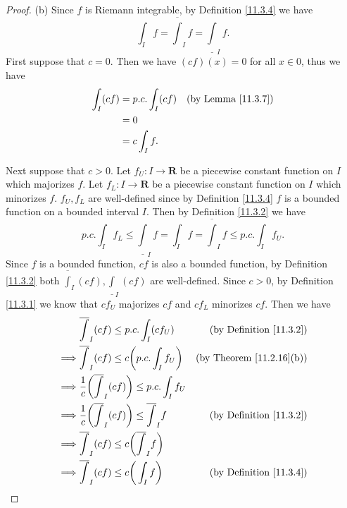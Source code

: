 \begin{proof}{(b)}
    Since \(f\) is Riemann integrable, by Definition \ref{11.3.4} we have
    \[
        \int_I f = \overline{\int}_I f = \underline{\int}_I f.
    \]
    First suppose that \(c = 0\).
    Then we have \((cf)(x) = 0\) for all \(x \in 0\), thus we have
    \begin{align*}
        \int_I (cf) & = p.c. \int_I (cf) & \text{(by Lemma \ref{11.3.7})} \\
                    & = 0                                                 \\
                    & = c \int_I f.
    \end{align*}

    Next suppose that \(c > 0\).
    Let \(f_U : I \to \mathbf{R}\) be a piecewise constant function on \(I\) which majorizes \(f\).
    Let \(f_L : I \to \mathbf{R}\) be a piecewise constant function on \(I\) which minorizes \(f\).
    \(f_U, f_L\) are well-defined since by Definition \ref{11.3.4} \(f\) is a bounded function on a bounded interval \(I\).
    Then by Definition \ref{11.3.2} we have
    \[
        p.c. \int_I f_L \leq \underline{\int}_I f = \int_I f = \overline{\int}_I f \leq p.c. \int_I f_U.
    \]
    Since \(f\) is a bounded function, \(cf\) is also a bounded function, by Definition \ref{11.3.2} both \(\overline{\int}_I (cf), \underline{\int}_I (cf)\) are well-defined.
    Since \(c > 0\), by Definition \ref{11.3.1} we know that \(c f_U\) majorizes \(c f\) and \(c f_L\) minorizes \(c f\).
    Then we have
    \begin{align*}
                 & \overline{\int}_I (cf) \leq p.c. \int_I (c f_U)                         & \text{(by Definition \ref{11.3.2})}  \\
        \implies & \overline{\int}_I (cf) \leq c \bigg(p.c. \int_I f_U\bigg)               & \text{(by Theorem \ref{11.2.16}(b))} \\
        \implies & \frac{1}{c} \bigg(\overline{\int}_I (cf)\bigg) \leq p.c. \int_I f_U                                            \\
        \implies & \frac{1}{c} \bigg(\overline{\int}_I (cf)\bigg) \leq \overline{\int}_I f & \text{(by Definition \ref{11.3.2})}  \\
        \implies & \overline{\int}_I (cf) \leq c\bigg(\overline{\int}_I f\bigg)                                                   \\
        \implies & \overline{\int}_I (cf) \leq c\bigg(\int_I f\bigg)                       & \text{(by Definition \ref{11.3.4})}

\end{align*}
\end{proof}
